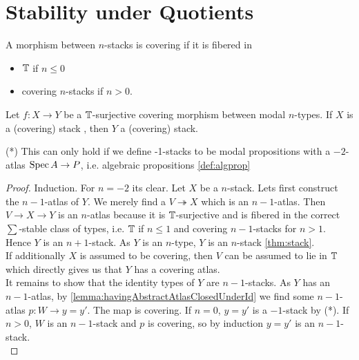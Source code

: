 \documentclass{article}
\begin{document}








\section{Stability under Quotients}
\begin{definition}
	A morphism between $n$-stacks is covering if it is fibered in 
	\begin{itemize}
		\item $\mathbb{T}$ if $n \le 0$
		\item covering $n$-stacks if $n > 0$.
	\end{itemize}
\end{definition}

\begin{theorem}{\label{thm:quotients}}
	Let $f : X \to Y$ be a $\mathbb{T}$-surjective covering morphism between modal $n$-types. If $X$ is a (covering) stack , then $Y$ a  (covering) stack.
\end{theorem}
(*) This can only hold if we define -1-stacks to be  modal propositions with a $-2$-atlas $\operatorname{Spec} A \to P$, i.e. algebraic propositions \ref{def:algprop} %
\begin{proof}
	Induction.
	For $n = -2$ its clear.
	Let $X$ be a  $n$-stack. Lets first construct the $n-1$-atlas of $Y$.
	We merely find a $V \twoheadrightarrow X$ which is an $n-1$-atlas.  Then $V \to X \to Y$ is an $n$-atlas because it is $\mathbb{T}$-surjective and is fibered in the correct $\sum$-stable class of types, i.e. $\mathbb{T}$ if $n \le 1$ and  covering $n-1$-stacks for $n > 1$. Hence $Y$ is an $n+1$-stack. As $Y$ is an $n$-type, $Y$ is an $n$-stack \ref{thm:stack}. \\
	If additionally $X$ is assumed to be covering, then $V$ can be assumed to lie in $\mathbb{T}$ which directly gives us that $Y$ has a covering atlas. \\
	It remains to show that the identity types of $Y$ are  $n-1$-stacks. As $Y$ has an $n-1$-atlas, by \ref{lemma:havingAbstractAtlasClosedUnderId} we  find some $n-1$-atlas $p : W \to y=y'$. The map is covering. %
	If $n=0$, $y = y'$ is a $-1$-stack by (*). If $n > 0$, $W$ is an $n-1$-stack and $p$ is covering, so by induction $y = y'$ is an $n-1$-stack. \\

	
	
\end{proof}
\end{document}
